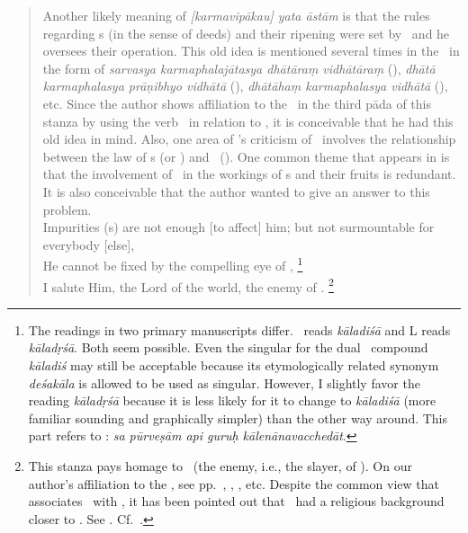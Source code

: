 \begin{verse}
{	Another likely meaning of \emph{[karmavipākau] yata āstām} is that the rules regarding \karman\/s (in the sense of deeds) and their ripening were set by \Isvara\ and he oversees their operation.  This old idea is mentioned several times in the \BhGBh\ in the form of \emph{sarvasya karma\-phala\-jātasya dhātāraṃ vidhātāraṃ} (), \emph{dhātā karma\-phalasya prāṇibhyo vidhātā} (), \emph{dhātāhaṃ karma\-phalasya vidhātā} (), etc.  Since the author shows affiliation to the \BhG\ in the third pāda of this stanza by using the verb \kal\ in relation to \kala, it is conceivable that he had this old idea in mind.  Also, one area of \Kumarila's criticism of \Isvara\ involves the relationship between the law of \karman\/s (or \dharma) and \Isvara\ ().  One common theme that appears in  is that the involvement of \Isvara\ in the workings of \karman\/s and their fruits is redundant.  It is also conceivable that the author wanted to give an answer to this problem.%
	}\\
  Impurities (\klesa\/s) are not enough [to affect] him; but not surmountable for everybody [else], \\%
  He cannot be fixed by the compelling eye of ,%
  \footnote{The readings in two primary manuscripts differ. \Tm\ reads \emph{kāladiśā} and L reads \emph{kāladṛśā}.  Both seem possible.  Even the singular for the dual \DD\ compound \emph{kāladiś} may still be acceptable because its etymologically related synonym \emph{deśakāla} is allowed to be used as singular.  However, I slightly favor the reading \emph{kāladṛśā} because it is less likely for it to change to \emph{kāladiśā} (more familiar sounding and graphically simpler) than the other way around.  This part refers to : \emph{sa pūrveṣām api guruḥ kālenānavacchedāt}.%
  } \\
  I salute Him, the Lord of the world, the enemy of \Kaitabha.%
  \footnote{\label{VSNSM1}This stanza pays homage to \Visnu\ (the enemy, i.e., the slayer, of \Kaitabha).  On our author's affiliation to the \Vaisnavism, see pp.\ \pageref{NRYNN25}, \pageref{NNRYN26}, \pageref{VISNU27}, etc.  Despite the common view that associates \Sankara\ with \Saivism, it has been pointed out that \Sankara\ had a religious background closer to \Vaisnavism.  See \citet{hacker:relation}.  Cf.\ \citet[4]{mayeda:thousand}.}%
  

\end{verse}
